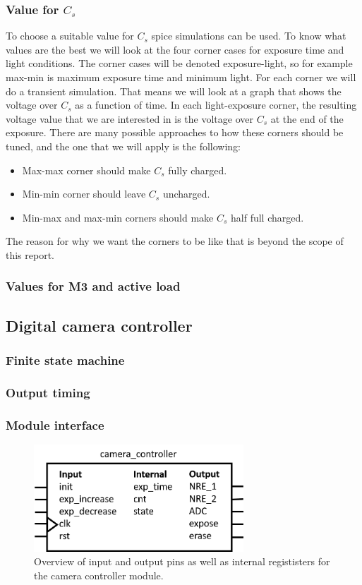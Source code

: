 \subsubsection{Value for $C_s$}

To choose a suitable value for $C_s$ spice simulations can be used. To know what values are the best we will look at the four corner cases for exposure time and light conditions. The corner cases will be denoted exposure-light, so for example max-min is maximum exposure time and minimum light. For each corner we will do a transient simulation. That means we will look at a graph that shows the voltage over $C_s$ as a function of time. In each light-exposure corner, the resulting voltage value that we are interested in is the voltage over $C_s$ at the end of the exposure. There are many possible approaches to how these corners should be tuned, and the one that we will apply is the following:

\begin{itemize}
    \item Max-max corner should make $C_s$ fully charged.
    \item Min-min corner should leave $C_s$ uncharged.
    \item Min-max and max-min corners should make $C_s$ half full charged.
\end{itemize}

The reason for why we want the corners to be like that is beyond the scope of this report.

\subsubsection{Values for M3 and active load}

\subsection{Digital camera controller}

\subsubsection{Finite state machine}

\subsubsection{Output timing}

\subsubsection{Module interface}

\begin{figure}
    \centering
    \includegraphics[width=0.7\textwidth]{graphs/camera_controller_pinout.png}
    \caption{Overview of input and output pins as well as internal regististers for the camera controller module.}
\end{figure}
